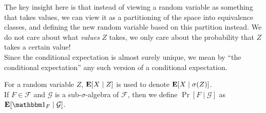 The key insight here is that instead of viewing a random variable as something that takes values, we can view it as a partitioning of the space into equivalence classes, and defining the new random variable based on this partition instead. We do not care about what \emph{values} $Z$ takes, we only care about the probability that $Z$ takes a certain value!\\
Since the conditional expectation is almost surely unique, we mean by ``the conditional expectation'' any such version of a conditional expectation. 

For a random variable $Z$, $\textbf{E}[X\mid Z]$ is used to denote $\textbf{E}[X\mid\sigma(Z)]$.\\

If $F\in\mathcal{F}$ and $\mathcal{G}$ is a sub-$\sigma$-algebra of $\mathcal{F}$, then we define $\Pr[F\mid\mathcal{G}]$ as $\expec[\indic_F\mid\mathcal{G}]$.


